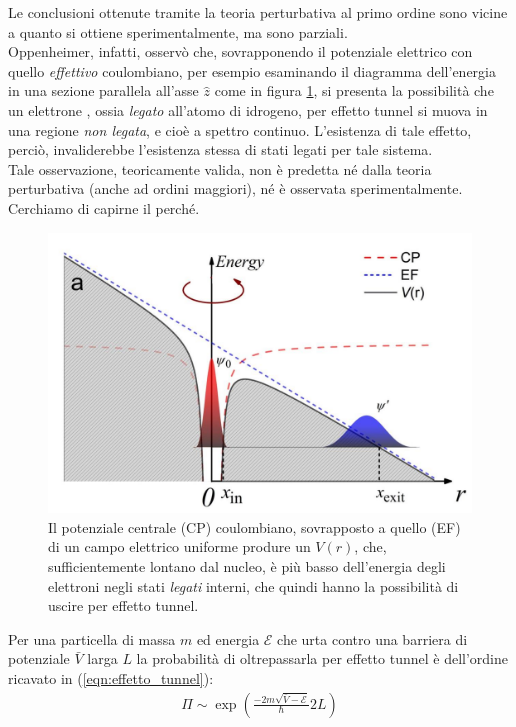 \documentclass[../../FisicaTeorica.tex]{subfiles}
\begin{document}
Le conclusioni ottenute tramite la teoria perturbativa al primo ordine sono vicine a quanto si ottiene sperimentalmente, ma sono parziali.\\
Oppenheimer, infatti, osservò che, sovrapponendo il potenziale elettrico con quello \textit{effettivo} coulombiano, per esempio esaminando il diagramma dell'energia in una sezione parallela all'asse $\hat{z}$ come in figura \ref{fig:tunneling_ionization},
si presenta la possibilità che un elettrone , ossia \textit{legato}  all'atomo di idrogeno, per effetto tunnel si muova in una regione \textit{non legata}, e cioè a spettro continuo. L'esistenza di tale effetto, perciò, invaliderebbe l'esistenza stessa di stati legati per tale sistema.\\
Tale osservazione, teoricamente valida, non è predetta né dalla teoria perturbativa (anche ad ordini maggiori), né è osservata sperimentalmente. Cerchiamo di capirne il perché. 
\begin{figure}[H]
\centering
\includegraphics[scale=0.3]{Immagini/14_12/image002.jpg}
\caption{Il potenziale centrale (CP) coulombiano, sovrapposto a quello (EF) di un campo elettrico uniforme produre un $V(r)$, che, sufficientemente lontano dal nucleo, è più basso dell'energia degli elettroni negli stati \textit{legati} interni, che quindi hanno la possibilità di uscire per effetto tunnel.\label{fig:tunneling_ionization}}
\end{figure}
Per una particella di massa $m$ ed energia $\mathcal{E}$ che urta contro una barriera di potenziale $\bar{V}$ larga $L$ la probabilità di oltrepassarla per effetto tunnel è dell'ordine ricavato in (\ref{eqn:effetto_tunnel}):
\begin{align*}
\Pi \sim \exp\left(\frac{-2m\sqrt{\bar{V}-\mathcal{E}}}{\hbar}2L\right)
\end{align*}
\end{document}
